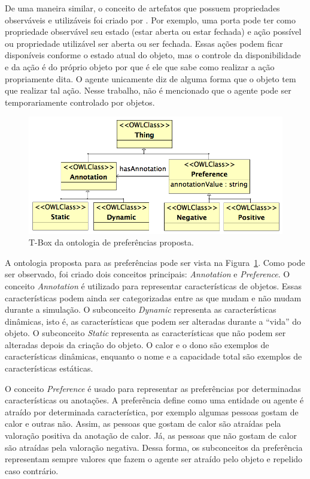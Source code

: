 De uma maneira similar, o conceito de artefatos que possuem propriedades
observáveis e utilizáveis foi criado por \citet{ricci31cartago}. Por exemplo,
uma porta pode ter como propriedade observável seu estado (estar aberta ou
estar fechada) e ação possível ou propriedade utilizável ser aberta ou ser
fechada. Essas ações podem ficar disponíveis conforme o estado atual do
objeto, mas o controle da disponibilidade e da ação é do próprio objeto por
que é ele que sabe como realizar a ação propriamente dita. O agente unicamente
diz de alguma forma que o objeto tem que realizar tal ação. Nesse trabalho,
não é mencionado que o agente pode ser temporariamente controlado por
objetos.

\begin{figure}
  \centering
    \includegraphics[width=130mm]{figuras/preferences.png}
  \caption{T-Box da ontologia de preferências proposta.}
  \label{fig:preferences}
\end{figure}

A ontologia proposta para as preferências pode ser vista na
Figura~\ref{fig:preferences}. Como pode ser observado, foi criado dois
conceitos principais: \emph{Annotation} e \emph{Preference}. O conceito
\emph{Annotation} é utilizado para representar características de objetos.
Essas características podem ainda ser categorizadas entre as que mudam
e não mudam durante a simulação. O subconceito \emph{Dynamic} representa as
características dinâmicas, isto é, as características que podem ser alteradas
durante a ``vida'' do objeto. O subconceito \emph{Static} representa as
características que não podem ser alteradas depois da criação do objeto. O
calor e o dono são exemplos de características dinâmicas, enquanto o nome e a
capacidade total são exemplos de características estáticas.

O conceito \emph{Preference} é usado para representar as preferências por
determinadas características ou anotações. A preferência define como uma entidade ou
agente é atraído por determinada característica, por exemplo algumas pessoas
gostam de calor e outras não. Assim, as pessoas que gostam de calor são
atraídas pela valoração positiva da anotação de calor. Já, as pessoas que não
gostam de calor são atraídas pela valoração negativa. Dessa forma, os
subconceitos da preferência representam sempre valores que fazem o agente ser
atraído pelo objeto e repelido caso contrário.


